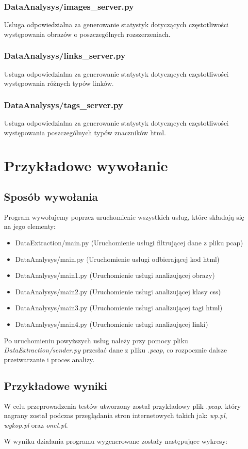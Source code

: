 \documentclass[12pt]{article}
\begin{document}
\subsubsection{DataAnalysys/images\_server.py} 
Usługa odpowiedzialna za generowanie statystyk dotyczących częstotliwości występowania obrazów o poszczególnych rozszerzeniach.

\subsubsection{DataAnalysys/links\_server.py} 
Usługa odpowiedzialna za generowanie statystyk dotyczących częstotliwości występowania różnych typów linków.

\subsubsection{DataAnalysys/tags\_server.py} 
Usługa odpowiedzialna za generowanie statystyk dotyczących częstotliwości występowania poszczególnych typów znaczników html.


\section{Przykładowe wywołanie}
\subsection{Sposób wywołania}
Program wywołujemy poprzez uruchomienie wszystkich usług, które składają się na jego elementy:
\begin{itemize}
\item DataExtraction/main.py (Uruchomienie usługi filtrującej dane z pliku pcap)
\item DataAnalysys/main.py (Uruchomienie usługi odbierającej kod html)
\item DataAnalysys/main1.py (Uruchomienie usługi analizującej obrazy)
\item DataAnalysys/main2.py (Uruchomienie usługi analizującej klasy css)
\item DataAnalysys/main3.py (Uruchomienie usługi analizującej tagi html)
\item DataAnalysys/main4.py (Uruchomienie usługi analizującej linki)
\end{itemize}

Po uruchomieniu powyższych usług należy przy pomocy pliku \emph{DataExtraction/sender.py} przesłać dane z pliku \emph{.pcap}, co rozpocznie dalsze przetwarzanie i proces analizy. 

\subsection{Przykładowe wyniki}
W celu przeprowadzenia testów utworzony został przykładowy plik \emph{.pcap}, który nagrany został podczas przeglądania stron internetowych takich jak: \emph{wp.pl}, \emph{wykop.pl} oraz \emph{onet.pl}. 

W wyniku działania programu wygenerowane zostały następujące wykresy:
\end{document}
